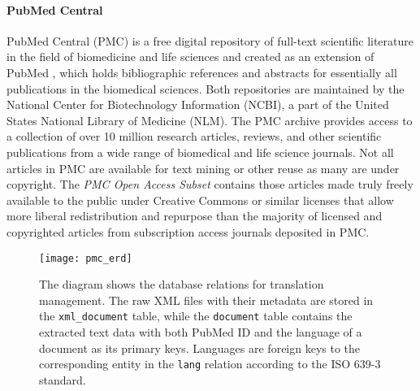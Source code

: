 \paragraph{PubMed Central}
PubMed Central (PMC) is a free digital repository of full-text scientific
literature in the field of biomedicine and life sciences and created as an
extension of PubMed \cite{white2020pubmed}, which holds bibliographic references
and abstracts for essentially all publications in the biomedical sciences. Both
repositories are maintained by the National Center for Biotechnology Information
(NCBI), a part of the United States National Library of Medicine (NLM). The PMC
archive provides access to a collection of over 10 million research articles,
reviews, and other scientific publications from a wide range of biomedical and
life science journals. Not all articles in PMC are available for text mining or
other reuse as many are under copyright. The \textit{PMC Open Access Subset}
\cite{pmcoa} contains those articles made truly freely available to the public
under Creative Commons or similar licenses that allow more liberal
redistribution and repurpose than the majority of licensed and copyrighted
articles from subscription access journals deposited in PMC.

\begin{figure}[!htb]
    \centering
    \texttt{[image: pmc\_erd]}
    \caption[Database design for PMC translation]{The diagram shows the database
    relations for translation management. The raw XML files with their metadata
    are stored in the \texttt{xml\_document} table, while the \texttt{document}
    table contains the extracted text data with both PubMed ID and the language
    of a document as its primary keys. Languages are foreign keys to the
    corresponding entity in the \texttt{lang} relation according to the ISO
    639-3 standard.}
    \label{fig:pmc_erd}
  \end{figure}

